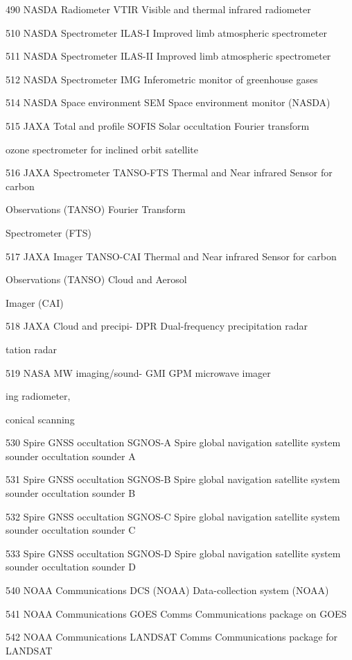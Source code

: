 490 NASDA Radiometer VTIR Visible and thermal infrared radiometer

510 NASDA Spectrometer ILAS-I Improved limb atmospheric spectrometer

511 NASDA Spectrometer ILAS-II Improved limb atmospheric spectrometer

512 NASDA Spectrometer IMG Inferometric monitor of greenhouse gases

514 NASDA Space environment SEM Space environment monitor (NASDA)

515 JAXA Total and profile SOFIS Solar occultation Fourier transform

ozone spectrometer for inclined orbit satellite

516 JAXA Spectrometer TANSO-FTS Thermal and Near infrared Sensor for carbon

Observations (TANSO) Fourier Transform

Spectrometer (FTS)

517 JAXA Imager TANSO-CAI Thermal and Near infrared Sensor for carbon

Observations (TANSO) Cloud and Aerosol

Imager (CAI)

518 JAXA Cloud and precipi- DPR Dual-frequency precipitation radar

tation radar

519 NASA MW imaging/sound- GMI GPM microwave imager

ing radiometer,

conical scanning

530 Spire GNSS occultation SGNOS-A Spire global navigation satellite system\\
sounder occultation sounder A

531 Spire GNSS occultation SGNOS-B Spire global navigation satellite system\\
sounder occultation sounder B

532 Spire GNSS occultation SGNOS-C Spire global navigation satellite system\\
sounder occultation sounder C

533 Spire GNSS occultation SGNOS-D Spire global navigation satellite system\\
sounder occultation sounder D

540 NOAA Communications DCS (NOAA) Data-collection system (NOAA)

541 NOAA Communications GOES Comms Communications package on GOES

542 NOAA Communications LANDSAT Comms Communications package for LANDSAT

